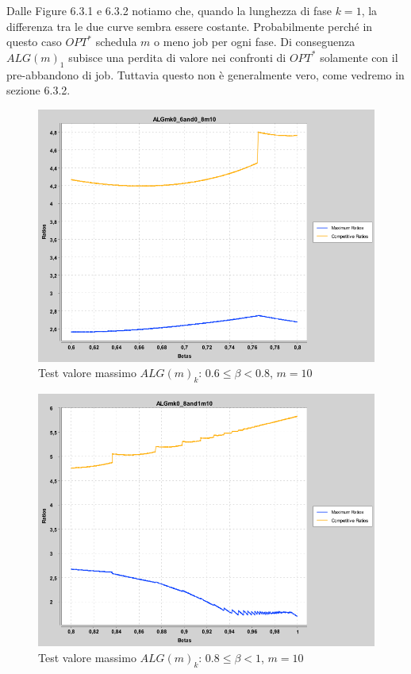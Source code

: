 \documentclass[twoside,openany,titlepage,fleqn,
	headinclude,12pt,a4paper,BCOR5mm,footinclude]{scrbook}
\begin{document}
Dalle Figure 6.3.1 e 6.3.2 notiamo che, quando la lunghezza di fase $k = 1$, la differenza tra le due curve sembra essere costante. Probabilmente perché in questo caso $OPT^{*}$ schedula $m$ o meno job per ogni fase. Di conseguenza $ALG(m)_{1}$ subisce una perdita di valore nei confronti di $OPT^{*}$ solamente con il pre-abbandono di job. Tuttavia questo non è generalmente vero, come vedremo in sezione 6.3.2.

\begin{figure}[H]
\caption[Test valore massimo $ALG(m)_{k}$: $0.6 \leq \beta < 0.8$]{Test valore massimo $ALG(m)_{k}$: $0.6 \leq \beta < 0.8$, $m = 10$}
\centering
\includegraphics[scale=0.4]{max/ALGmk0_6and0_8m10.png}
\end{figure}
\begin{figure}[H]
\caption[Test valore massimo $ALG(m)_{k}$: $0.8 \leq \beta < 1$]{Test valore massimo $ALG(m)_{k}$: $0.8 \leq \beta < 1$, $m = 10$}
\centering
\includegraphics[scale=0.4]{max/ALGmk0_8and1m10.png}
\end{figure}
\end{document}
